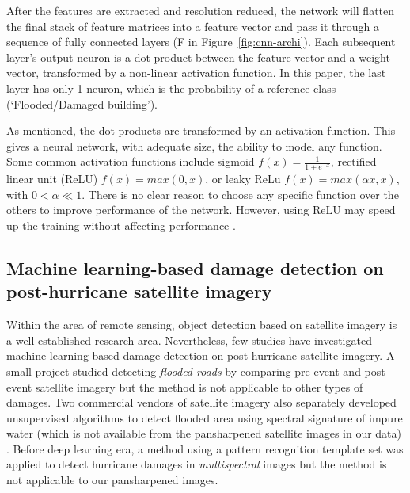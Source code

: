 \documentclass[journal, 12pt, onecolumn,draftclsnofoot]{IEEEtran}
\begin{document}
After the features are extracted and resolution reduced, the network will flatten the final stack of feature matrices into a feature vector and pass it through a sequence of fully connected layers (F in Figure~\ref{fig:cnn-archi}). Each subsequent layer's output neuron is a dot product between the feature vector and a weight vector, transformed by a non-linear activation function. In this paper, the last layer has only 1 neuron, which is the probability of a reference class (`Flooded/Damaged building'). 

As mentioned, the dot products are transformed by an activation function. This gives a neural network, with adequate size, the ability to model any function. Some common activation functions include sigmoid $f(x) = \frac{1}{1+e^{-x}}$, rectified linear unit (ReLU) $f(x) = max(0, x)$, or leaky ReLu $f(x) = max(\alpha x, x)$, with $0 < \alpha \ll 1$. There is no clear reason to choose any specific function over the others to improve performance of the network. However, using ReLU may speed up the training without affecting performance \cite{relu}.

\subsection{Machine learning-based damage detection on post-hurricane satellite imagery}

Within the area of remote sensing, object detection based on satellite imagery is a well-established research area. Nevertheless, few studies have investigated machine learning based damage detection on post-hurricane satellite imagery. A small project studied detecting \textit{flooded roads} by comparing pre-event and post-event satellite imagery \cite{Jack2017} but the method is not applicable to other types of damages. Two commercial vendors of satellite imagery also separately developed unsupervised algorithms to detect flooded area using spectral signature of impure water (which is not available from the pansharpened satellite images in our data) \cite{planet, gbd}. Before deep learning era, a method using a pattern recognition template set was applied to detect hurricane damages in \textit{multispectral} images \cite{Barnes2007} but the method is not applicable to our pansharpened images. 
\end{document}
